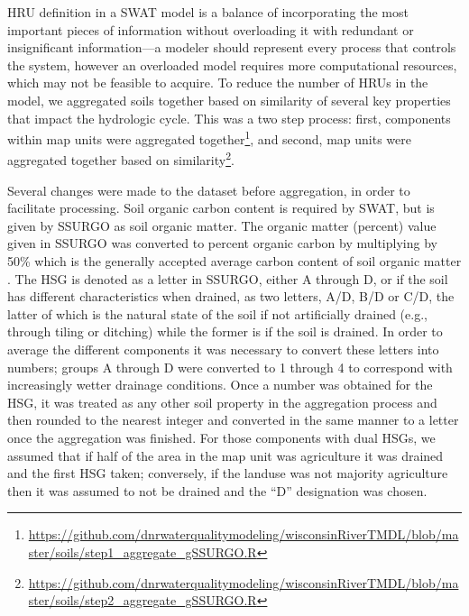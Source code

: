 HRU definition in a SWAT model is a balance of incorporating the most important
pieces of information without overloading it with redundant or insignificant
information---a modeler should represent every process that controls the system,
however an overloaded model requires more computational resources, which may not
be feasible to acquire. To reduce the number of HRUs in the model, we aggregated
soils together based on similarity of several key properties that impact the
hydrologic cycle. This was a two step process: first, components within map
units were aggregated
together\footnote{\url{https://github.com/dnrwaterqualitymodeling/wisconsinRiverTMDL/blob/master/soils/step1_aggregate_gSSURGO.R}},
and second, map units were aggregated together based on
similarity\footnote{\url{https://github.com/dnrwaterqualitymodeling/wisconsinRiverTMDL/blob/master/soils/step2_aggregate_gSSURGO.R}}.

Several changes were made to the dataset before aggregation, in order to
facilitate processing. Soil organic carbon content is required by SWAT, but is
given by SSURGO as soil organic matter. The organic matter (percent) value given in SSURGO
was converted to percent organic carbon by multiplying by 50\% which is the generally accepted average carbon content of soil organic matter \citep{brady_elements_2004}. The HSG is
denoted as a letter in SSURGO, either A through D, or if the soil has different
characteristics when drained, as two letters, A/D, B/D or C/D, the latter of
which is the natural state of the soil if not artificially drained (e.g.,
through tiling or ditching) while the former is if the soil is drained. In order
to average the different components it was necessary to convert these letters
into numbers; groups A through D were converted to 1 through 4 to correspond
with increasingly wetter drainage conditions. Once a number was obtained for the
HSG, it was treated as any other soil property in the aggregation process and
then rounded to the nearest integer and converted in the same manner to a letter
once the aggregation was finished. For those components with dual HSGs, we
assumed that if half of the area in the map unit was agriculture it was drained
and the first HSG taken; conversely, if the landuse was not majority agriculture
then it was assumed to not be drained and the ``D'' designation was chosen.

